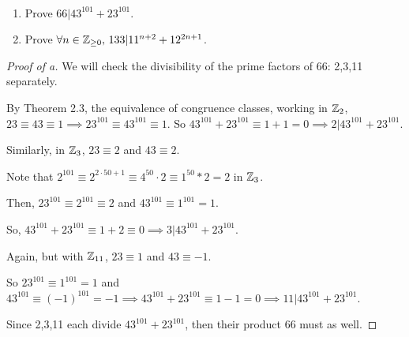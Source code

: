 \documentclass[../hw2]{subfiles}
\begin{document}
\begin{problem}[1]
\\
\begin{enumerate}[label=\alph*)]
	\item Prove $66 | 43^{101} + 23^{101}$.
	\item Prove $\forall n \in \mathbb{Z}_{\ge 0},\, 133|11^{n+2} + 12^{2n+1}$.
\end{enumerate}
\end{problem}
\begin{proof}[Proof of a]
	We will check the divisibility of the prime factors of 66: 2,3,11 separately.

	By Theorem 2.3, the equivalence of congruence classes, working in $\mathbb{Z}_2$,
	$23\equiv 43\equiv 1 \implies 23^{101} \equiv 43^{101}\equiv 1$.
	So $43^{101} + 23^{101}\equiv 1+1 = 0\implies 2 | 43^{101} + 23^{101}$.

	Similarly, in $\mathbb{Z}_3$, $23\equiv 2$ and $43\equiv 2$.

	Note that $2^{101}\equiv 2^{2\cdot 50+1}\equiv 4^{50}\cdot 2\equiv 1^{50}*2 = 2$ in $\mathbb{Z}_3$.

	Then, $23^{101}\equiv 2^{101}\equiv 2$ and $43^{101}\equiv 1^{101}=1$.

	So, $43^{101} + 23^{101}\equiv 1+2\equiv 0 \implies 3 | 43^{101} + 23^{101}$.

	Again, but with $\mathbb{Z}_{11}$, $23\equiv 1$ and $43\equiv -1$.

	So $23^{101}\equiv 1^101= 1$ and $43^{101}\equiv (-1)^{101} = -1 \implies 43^{101} + 23^{101} \equiv 1-1 = 0 \implies 11 | 43^{101} + 23^{101}$.

	Since 2,3,11 each divide $43^{101} + 23^{101}$, then their product 66 must as well.
\end{proof}
\end{document}
